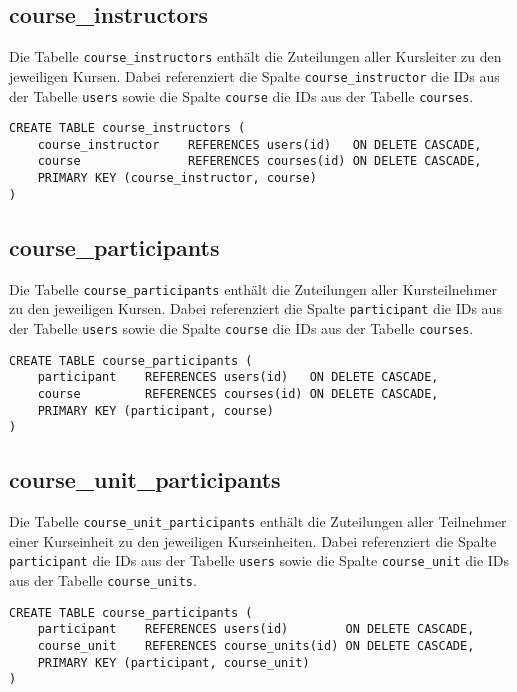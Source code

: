 \subsection{course\_instructors}
Die Tabelle \texttt{course\_instructors} enthält die Zuteilungen aller Kursleiter zu den jeweiligen Kursen. Dabei referenziert die Spalte \texttt{course\_instructor} die IDs aus der Tabelle \texttt{users} sowie die Spalte \texttt{course} die IDs aus der Tabelle \texttt{courses}.

\begin{verbatim}
CREATE TABLE course_instructors (
    course_instructor    REFERENCES users(id)   ON DELETE CASCADE,
    course               REFERENCES courses(id) ON DELETE CASCADE,
    PRIMARY KEY (course_instructor, course)
)
\end{verbatim}

\subsection{course\_participants}
Die Tabelle \texttt{course\_participants} enthält die Zuteilungen aller Kursteilnehmer zu den jeweiligen Kursen. Dabei referenziert die Spalte \texttt{participant} die IDs aus der Tabelle \texttt{users} sowie die Spalte \texttt{course} die IDs aus der Tabelle \texttt{courses}.

\begin{verbatim}
CREATE TABLE course_participants (
    participant    REFERENCES users(id)   ON DELETE CASCADE,
    course         REFERENCES courses(id) ON DELETE CASCADE,
    PRIMARY KEY (participant, course)
)
\end{verbatim}

\subsection{course\_unit\_participants}
Die Tabelle \texttt{course\_unit\_participants} enthält die Zuteilungen aller Teilnehmer einer Kurseinheit zu den jeweiligen Kurseinheiten. Dabei referenziert die Spalte \texttt{participant} die IDs aus der Tabelle \texttt{users} sowie die Spalte \texttt{course\_unit} die IDs aus der Tabelle \texttt{course\_units}.

\begin{verbatim}
CREATE TABLE course_participants (
    participant    REFERENCES users(id)        ON DELETE CASCADE,
    course_unit    REFERENCES course_units(id) ON DELETE CASCADE,
    PRIMARY KEY (participant, course_unit)
)
\end{verbatim}

